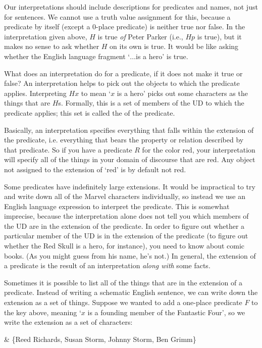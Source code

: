 Our interpretations should include descriptions for predicates and names, not just for sentences. We cannot use a truth value assignment for this, because a predicate by itself (except a 0-place predicate) is neither true nor false. In the interpretation given above, $H$ is true \emph{of} Peter Parker (i.e., $Hp$ is true), but it makes no sense to ask whether $H$ on its own is true. It would be like asking whether the English language fragment `$\ldots$is a hero' is true.

What does an interpretation do for a predicate, if it does not make it true or false? An interpretation helps to pick out the objects to which the predicate applies. Interpreting $Hx$ to mean `$x$ is a hero' picks out some characters as the things that are $H$s. Formally, this is a set of members of the UD to which the predicate applies; this set is called the  of the predicate. 


{\color{black} Basically, an interpretation specifies everything that falls within the extension of the predicate, i.e. everything that bears the property or relation described by that predicate. So if you have a predicate $R$ for the color red, your interpretation will specify all of the things in your domain of discourse that are red. Any object not assigned to the extension of `red' is by default not red.}

Some predicates have indefinitely large extensions. It would be impractical to try and write down all of the Marvel characters individually, so instead we use an English language expression to interpret the predicate. This is somewhat imprecise, because the interpretation alone does not tell you which members of the UD are in the extension of the predicate. In order to figure out whether a particular member of the UD is in the extension of the predicate (to figure out whether the Red Skull is a hero, for instance), you need to know about comic books. (As you might guess from his name, he's not.) In general, the extension of a predicate is the result of an interpretation \emph{along with} some facts.

Sometimes it is possible to list all of the things that are in the extension of a predicate. Instead of writing a schematic English sentence, we can write down the extension as a set of things. Suppose we wanted to add a one-place predicate $F$ to the key above, meaning `$x$ is a founding member of the Fantastic Four', so we write the extension as a set of characters:
\begin{partialmodel}
	 & \{Reed Richards, Susan Storm, Johnny Storm, Ben Grimm\}
\end{partialmodel}

